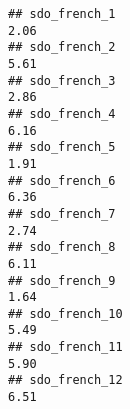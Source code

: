 \documentclass[
]{article}
\begin{document}
\begin{verbatim}
## sdo_french_1                                                                                                                                                                                                                  2.06
## sdo_french_2                                                                                                                                                                                                                  5.61
## sdo_french_3                                                                                                                                                                                                                  2.86
## sdo_french_4                                                                                                                                                                                                                  6.16
## sdo_french_5                                                                                                                                                                                                                  1.91
## sdo_french_6                                                                                                                                                                                                                  6.36
## sdo_french_7                                                                                                                                                                                                                  2.74
## sdo_french_8                                                                                                                                                                                                                  6.11
## sdo_french_9                                                                                                                                                                                                                  1.64
## sdo_french_10                                                                                                                                                                                                                 5.49
## sdo_french_11                                                                                                                                                                                                                 5.90
## sdo_french_12                                                                                                                                                                                                                 6.51

\end{verbatim}
\end{document}
